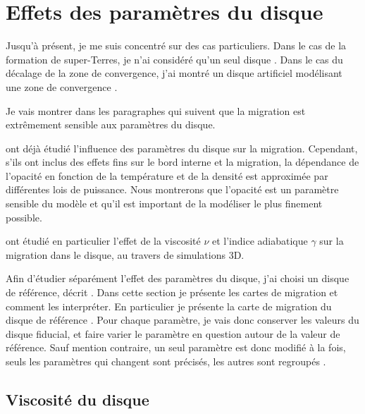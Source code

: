 \section{Effets des paramètres du disque}

Jusqu'à présent, je me suis concentré sur des cas particuliers. Dans le cas de la formation de super-Terres, je n'ai considéré qu'un seul disque . Dans le cas du décalage de la zone de convergence, j'ai montré un disque artificiel modélisant une zone de convergence . 

Je vais montrer dans les paragraphes qui suivent que la migration est extrêmement sensible aux paramètres du disque.

\cite{kretke2012importance} ont déjà étudié l'influence des paramètres du disque sur la migration. Cependant, s'ils ont inclus des effets fins sur le bord interne et la migration, la dépendance de l'opacité en fonction de la température et de la densité est approximée par différentes lois de puissance. Nous montrerons que l'opacité est un paramètre sensible du modèle et qu'il est important de la modéliser le plus finement possible. 

\cite{bitsch2013influence} ont étudié en particulier l'effet de la viscosité $\nu$ et l'indice adiabatique $\gamma$ sur la migration dans le disque, au travers de simulations 3D. 

Afin d'étudier séparément l'effet des paramètres du disque, j'ai choisi un disque de référence, décrit . Dans cette section je présente les cartes de migration et comment les interpréter. En particulier je présente la carte de migration du disque de référence . Pour chaque paramètre, je vais donc conserver les valeurs du disque fiducial, et faire varier le paramètre en question autour de la valeur de référence. Sauf mention contraire, un seul paramètre est donc modifié à la fois, seuls les paramètres qui changent sont précisés, les autres sont regroupés .


\subsection{Viscosité du disque}

